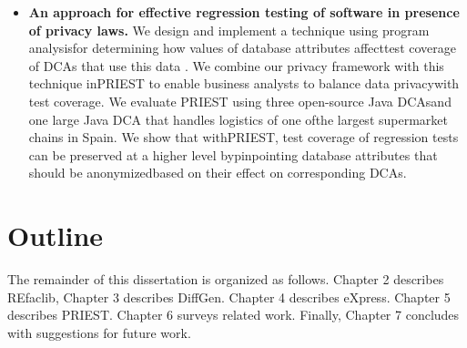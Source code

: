 \begin{itemize}
\item \textbf{An approach for effective regression testing of software in presence of privacy laws.}
We design and implement a technique using program analysisfor determining how values of database attributes affecttest coverage of DCAs that use this data . We combine our privacy framework with this technique inPRIEST to enable business analysts to balance data privacywith test coverage. We evaluate PRIEST using three open-source Java DCAsand one large Java DCA that handles logistics of one ofthe largest supermarket chains in Spain. We show that withPRIEST, test coverage of regression tests can be preserved at a higher level bypinpointing database attributes that should be anonymizedbased on their effect on corresponding DCAs.
\end{itemize}


\section{Outline}
The remainder of this dissertation is organized as follows. Chapter 2 describes REfaclib, 
Chapter 3 describes DiffGen. Chapter 4 describes eXpress. Chapter 5 describes PRIEST. Chapter 6 surveys related work. 
Finally, Chapter 7 concludes with suggestions for future work.